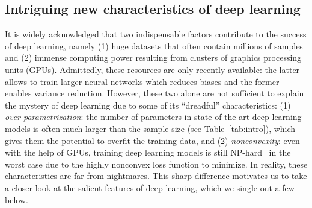 \subsection{Intriguing new characteristics of deep learning}

It is widely acknowledged that two indispensable factors contribute to the success of deep learning, namely (1) huge datasets that often contain millions of samples and (2) immense computing power resulting from clusters of graphics processing units (GPUs). Admittedly, these resources are only recently available: the latter allows to train larger neural networks which reduces biases and the former enables variance reduction. However, these two alone are not sufficient to explain the mystery of deep learning due to some of its ``dreadful'' characteristics: (1) \emph{over-parametrization}: the number of parameters in state-of-the-art deep learning models is often much larger than the sample size (see Table~\ref{tab:intro}), which gives them the potential to overfit the training data, and (2) \emph{nonconvexity}: even with the help of GPUs, training deep learning models is still NP-hard~\citep{arora2009computational} in the worst case due to the highly {nonconvex} loss function to minimize. In reality, these characteristics are far from nightmares. This sharp difference motivates us to take a closer look at the salient features of deep learning, which we single out a few below. %




